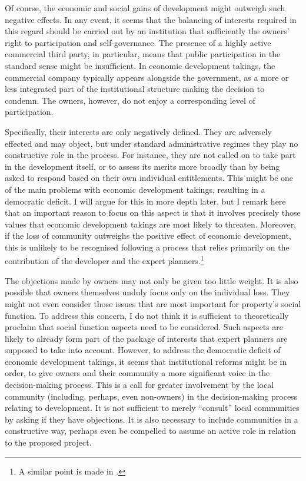 {Of course, the economic and social gains of development might outweigh such negative effects. In any event, it seems that the balancing of interests required in this regard should be carried out by an institution that sufficiently  the owners' right to participation and self-governance. The presence of a highly active commercial third party, in particular, means that public participation in the standard sense might be insufficient. In economic development takings, the commercial company typically appears alongside the government, as a more or less integrated part of the institutional structure making the decision to condemn. The owners, however, do not enjoy a corresponding level of participation.

Specifically, their interests are only negatively defined. They are adversely effected and may object, but under standard administrative regimes they play no constructive role in the process. For instance, they are not called on to take part in the development itself, or to assess its merits more broadly than by being asked to respond based on their own individual entitlements. This might be one of the main problems with economic development takings, resulting in a democratic deficit. I will argue for this in more depth later, but I remark here that an important reason to focus on this aspect is that it involves precisely those values that economic development takings are most likely to threaten. Moreover, if the loss of community outweighs the positive effect of economic development, this is unlikely to be recognised following a process that relies primarily on the contribution of the developer and the expert planners.\footnote{A similar point is made in \cite{underkuffler06}.} 

The objections made by owners may not only be given too little weight. It is also possible that owners themselves unduly focus only on the individual loss. They might not even consider those issues that are most important for property's social function. To address this concern, I do not think it is sufficient to theoretically proclaim that social function aspects need to be considered. Such aspects are likely to already form part of the package of interests that expert planners are supposed to take into account. However, to address the democratic deficit of economic development takings, it seems that institutional reforms might be in order, to give owners and their community a more significant voice in the decision-making process. This is a call for greater involvement by the local community (including, perhaps, even non-owners) in the decision-making process relating to development. It is not sufficient to merely ``consult'' local communities by asking if they have objections. It is also necessary to include communities in a constructive way, perhaps even be compelled to assume an active role in relation to the proposed project.

}
